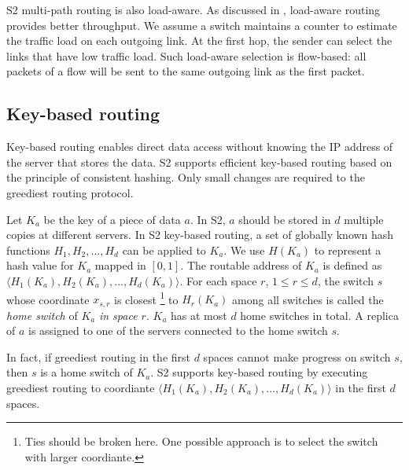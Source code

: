 \documentclass[10pt,conference]{IEEEtran}
\newtheorem{theorem}{Proposition}
\begin{document}
S2 multi-path routing is also load-aware. As discussed in \cite{Difs2014}, load-aware routing provides better throughput. We assume a switch maintains a counter to estimate the traffic load on each outgoing link.  At the first hop, the sender can select the links that have low traffic load. Such load-aware selection is flow-based: all packets of a flow will be sent to the same outgoing link as the first packet. 


\subsection{Key-based routing}

Key-based routing enables direct data access without knowing the IP address of the server that stores the data.
S2 supports efficient key-based routing based on the principle of consistent hashing.
Only small changes are required to the greediest routing protocol.

Let $K_a$ be the key of a piece of data $a$.
In S2, $a$ should be stored in $d$ multiple copies at different servers.
In S2 key-based routing, a set of globally known hash functions $H_1,H_2,...,H_d$ can be applied to $K_a$. We use $H(K_a)$ to represent a hash value for $K_a$ mapped in $[0, 1]$. The routable address of $K_a$ is defined as $\langle H_1(K_a),H_2(K_a),...,H_d(K_a)\rangle$.
For each space $r$, $1\leq r \leq d$, the switch $s$ whose coordinate $x_{s, r}$ is closest
\footnote{Ties should be broken here. One possible approach is to select the switch with larger coordiante.}
to $H_r(K_a)$ among all switches is called the \emph{home switch} of $K_a$ \emph{in space $r$}.
 $K_a$ has at most $d$ home switches in total.
A replica of $a$ is assigned to one of the servers connected to the home switch $s$.





\iffalse
\begin{theorem}
\label{thm:retrieve}
Given coordinate $\vec{Y}=\langle y_1, y_2, ..., y_d\rangle$, if all neighbors of switch $s$ have longer $d$-MCD to $\vec{Y}$ than $s$, then at least in one space $r$ ($1\leq r \leq d$), $s$'s coordinate $x_{r}$ is closest to $y_r$ among all switches in the network.
\end{theorem}
The above proposition can be proved using Lemma \ref{lemma1}, and the proof is formally presented in the appendix.
This proposition states that 
\fi
In fact, if greediest routing in the first $d$ spaces cannot make progress on switch $s$, then $s$ is a home switch of $K_a$.
S2 supports key-based routing by executing greediest routing to coordiante $\langle H_1(K_a),H_2(K_a),...,H_d(K_a)\rangle$ in the first $d$ spaces. 
\end{document}
